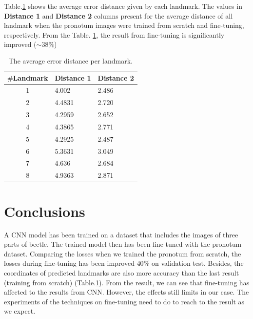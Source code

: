 \documentclass[12pt,a4paper]{article}
\begin{document}
Table.\ref{tab2} shows the average error distance given by each landmark. The values in \textbf{Distance 1} and \textbf{Distance 2} columns present for the average distance of all landmark when the pronotum images were trained from scratch and fine-tuning, respectively. From the Table. \ref{tab2}, the result from fine-tuning is significantly improved ($\sim 38\%$) 
\begin{table}[htbp]
\begin{center}
\begin{tabular}{|c|p{2.5cm}|p{2.5cm}|}
\hline
\textbf{$\#$Landmark} & \textbf{Distance 1} & \textbf{Distance 2} \\ \hline
1 & 4.002 & 2.486  \\ \hline
2 & 4.4831 & 2.720  \\ \hline
3 & 4.2959  & 2.652 \\ \hline
4 & 4.3865  & 2.771 \\ \hline
5 & 4.2925  & 2.487 \\ \hline
6 & 5.3631  & 3.049 \\ \hline
7 & 4.636  & 2.684 \\ \hline
8 & 4.9363  & 2.871 \\ \hline
\end{tabular}
\caption{The average error distance per landmark.}
\label{tab2}
\end{center}
\end{table}

\section{Conclusions}
A CNN model has been trained on a dataset that includes the images of three parts of beetle. The trained model then has been fine-tuned with the pronotum dataset. Comparing the losses when we trained the pronotum from scratch, the losses during fine-tuning has been improved $40\%$ on validation test. Besides, the coordinates of predicted landmarks are also more accuracy than the last result (training from scratch) (Table.\ref{tab2}). From the result, we can see that fine-tuning has affected to the results from CNN. However, the effects still limits in our case. The experiments of the techniques on fine-tuning need to do to reach to the result as we expect.


\end{document}
